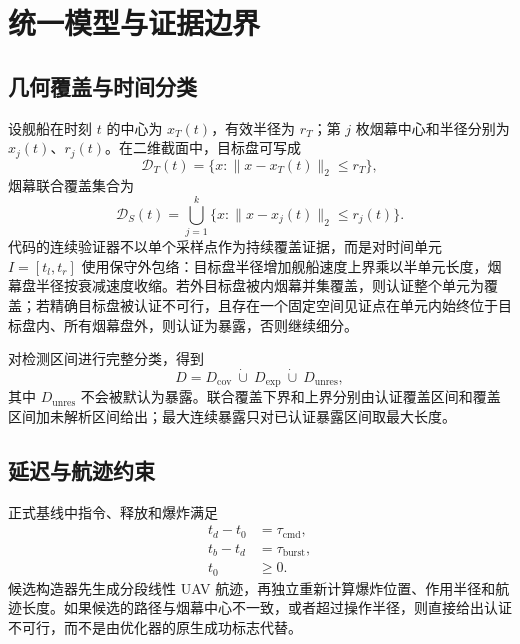 \section{统一模型与证据边界}

\subsection{几何覆盖与时间分类}

设舰船在时刻 $t$ 的中心为 $x_T(t)$，有效半径为 $r_T$；第 $j$ 枚烟幕中心和半径分别为 $x_j(t)$、$r_j(t)$。在二维截面中，目标盘可写成
\begin{equation}
  \mathcal{D}_T(t)=\{x:\|x-x_T(t)\|_2\le r_T\},
  \label{eq:target-disk}
\end{equation}
烟幕联合覆盖集合为
\begin{equation}
  \mathcal{D}_S(t)=\bigcup_{j=1}^{k}\{x:\|x-x_j(t)\|_2\le r_j(t)\}.
  \label{eq:smoke-union}
\end{equation}
代码的连续验证器不以单个采样点作为持续覆盖证据，而是对时间单元 $I=[t_l,t_r]$ 使用保守外包络：目标盘半径增加舰船速度上界乘以半单元长度，烟幕盘半径按衰减速度收缩。若外目标盘被内烟幕并集覆盖，则认证整个单元为覆盖；若精确目标盘被认证不可行，且存在一个固定空间见证点在单元内始终位于目标盘内、所有烟幕盘外，则认证为暴露，否则继续细分。

对检测区间进行完整分类，得到
\begin{equation}
  D = D_{\mathrm{cov}}\ \dot\cup\ D_{\mathrm{exp}}\ \dot\cup\ D_{\mathrm{unres}},
  \label{eq:time-partition}
\end{equation}
其中 $D_{\mathrm{unres}}$ 不会被默认为暴露。联合覆盖下界和上界分别由认证覆盖区间和覆盖区间加未解析区间给出；最大连续暴露只对已认证暴露区间取最大长度。

\subsection{延迟与航迹约束}

正式基线中指令、释放和爆炸满足
\begin{align}
  t_d-t_0 &= \tau_{\mathrm{cmd}}, \\
  t_b-t_d &= \tau_{\mathrm{burst}}, \\
  t_0 &\ge 0.
  \label{eq:delays}
\end{align}
候选构造器先生成分段线性 UAV 航迹，再独立重新计算爆炸位置、作用半径和航迹长度。如果候选的路径与烟幕中心不一致，或者超过操作半径，则直接给出认证不可行，而不是由优化器的原生成功标志代替。

